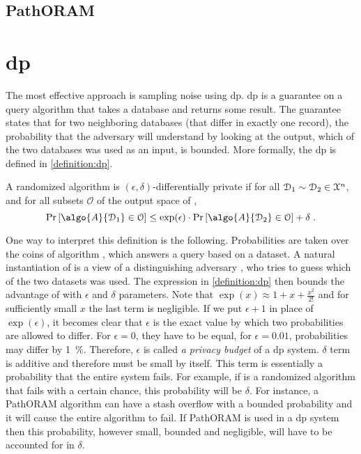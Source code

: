 		\subsection{PathORAM}

	\section{\texorpdfstring{\acrlong{dp}}{Differential Privacy}}

		The most effective approach is sampling noise using \acrfull{dp}.
		\acrshort{dp} is a guarantee on a query algorithm that takes a database and returns some result.
		The guarantee states that for two neighboring databases (that differ in exactly one record), the probability that the adversary will understand by looking at the output, which of the two databases was used as an input, is bounded.
		More formally, the \acrlong{dp} is defined in \cref{definition:dp}.

		\begin{definition}\label{definition:dp}
			A randomized algorithm  is $(\epsilon, \delta)$-differentially private if for all $\mathcal{D}_1 \sim \mathcal{D}_2 \in \mathcal{X}^{n}$, and for all subsets $\mathcal{O}$ of the output space of ,
			\[
				\probability{ \algo{A}{ \database_1 } \in \mathcal{O} } \leq \exp(\epsilon) \cdot \probability{ \algo{A}{ \database_2 } \in \mathcal{O} } + \delta \; .
			\]
		\end{definition}

		One way to interpret this definition is the following.
		Probabilities are taken over the coins of algorithm , which answers a query based on a dataset.
		A natural instantiation of  is a view of a distinguishing adversary \adversary{}, who tries to guess which of the two datasets was used.
		The expression in \cref{definition:dp} then bounds the advantage of \adversary{} with $\epsilon$ and $\delta$ parameters.
		Note that $\exp( x ) \approx 1 + x + \frac{x^2}{2!}$ and for sufficiently small $x$ the last term is negligible.
		If we put $\epsilon + 1$ in place of $\exp( \epsilon )$, it becomes clear that $\epsilon$ is the exact value by which two probabilities are allowed to differ.
		For $\epsilon = 0$, they have to be equal, for $\epsilon = 0.01$, probabilities may differ by \SI{1}{\percent}.
		Therefore, $\epsilon$ is called \emph{a privacy budget} of a \acrshort{dp} system.
		$\delta$ term is additive and therefore must be small by itself.
		This term is essentially a probability that the entire system fails.
		For example, if  is a randomized algorithm that fails with a certain chance, this probability will be $\delta$.
		For instance, a PathORAM \cite{path-oram} algorithm can have a stash overflow with a bounded probability \cite[Theorem 1]{path-oram} and it will cause the entire algorithm to fail.
		If PathORAM is used in a \acrshort{dp} system then this probability, however small, bounded and negligible, will have to be accounted for in $\delta$.

